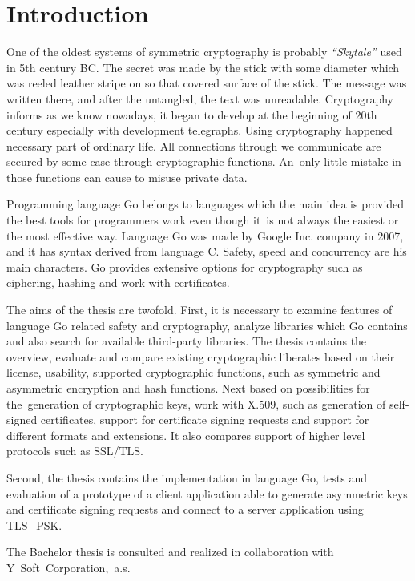 \documentclass[
  twoside, 12pt, 
  printed, %
  notable,   %
  lof,     %
  lot,     %
]{fithesis3}
\begin{document}
\chapter{Introduction}
One of the oldest systems of symmetric cryptography is probably \textit{“Skytale”} used in 5th 
century BC. 
The secret was made by the stick with some diameter which was reeled leather stripe on so that 
covered surface of the stick. The message was written there, and after the untangled, the text was 
unreadable. Cryptography informs as we know nowadays, it began to develop at the beginning of 20th 
century especially with development telegraphs. Using cryptography happened necessary part of 
ordinary life. All connections through we communicate are secured by some case through 
cryptographic functions. An~only little mistake in those functions can cause to misuse private 
data. 
    
Programming language Go belongs to languages which the main idea is provided the best tools for 
programmers work even though it~is not always the easiest or the most effective way. Language Go 
was made by Google Inc. company in 2007, and it has syntax derived from language C. Safety, speed 
and concurrency are his main characters. Go provides extensive options for cryptography such as 
ciphering, hashing and work with certificates. 

The aims of the thesis are twofold. First, it is necessary to examine features of language Go 
related safety and cryptography, analyze libraries which Go contains and also search for available 
third-party libraries. The thesis contains the overview, evaluate and compare existing 
cryptographic liberates based on their license, usability, supported cryptographic functions, such 
as symmetric and asymmetric encryption and hash functions. Next based on possibilities for 
the~generation of cryptographic keys, work with X.509, such as generation of self-signed 
certificates, support for certificate signing requests and support for different formats and 
extensions.  It also compares support of higher level protocols such as SSL/TLS.    

Second, the thesis contains the implementation in language Go, tests and evaluation of a 
prototype of a client application able to generate asymmetric keys and certificate signing 
requests and connect to a server application using TLS\_PSK.

The Bachelor thesis is consulted and realized in collaboration with Y~Soft~Corporation,~a.s.
\end{document}
